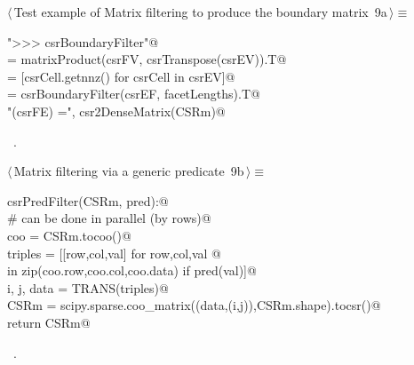 \documentclass[11pt,oneside]{article}    %
\begin{document}
\begin{flushleft} \small \label{scrap15}
\protect{}$\langle\,$Test example of Matrix filtering to produce the boundary matrix\nobreak\ {\footnotesize 9a}$\,\rangle\equiv$
\vspace{-1ex}
\begin{list}{}{} \item
\mbox{}\verb@print "\n>>> csrBoundaryFilter"@\\
\mbox{}\verb@csrEF = matrixProduct(csrFV, csrTranspose(csrEV)).T@\\
\mbox{}\verb@facetLengths = [csrCell.getnnz() for csrCell in csrEV]@\\
\mbox{}\verb@CSRm = csrBoundaryFilter(csrEF, facetLengths).T@\\
\mbox{}\verb@print "\ncsrMaxFilter(csrFE) =\n", csr2DenseMatrix(CSRm)@\\
\mbox{}\verb@@{\NWsep}
\end{list}
\vspace{-1ex}
\footnotesize\addtolength{\baselineskip}{-1ex}
\begin{list}{}{\setlength{\itemsep}{-\parsep}\setlength{\itemindent}{-\leftmargin}}
\item \NWtxtMacroRefIn\ .
\end{list}
\end{flushleft}
\begin{flushleft} \small \label{scrap16}
\protect{}$\langle\,$Matrix filtering via a generic predicate\nobreak\ {\footnotesize 9b}$\,\rangle\equiv$
\vspace{-1ex}
\begin{list}{}{} \item
\mbox{}\verb@def csrPredFilter(CSRm, pred):@\\
\mbox{}\verb@    # can be done in parallel (by rows)@\\
\mbox{}\verb@    coo = CSRm.tocoo()@\\
\mbox{}\verb@    triples = [[row,col,val] for row,col,val @\\
\mbox{}\verb@                in zip(coo.row,coo.col,coo.data) if pred(val)]@\\
\mbox{}\verb@    i, j, data = TRANS(triples)@\\
\mbox{}\verb@    CSRm = scipy.sparse.coo_matrix((data,(i,j)),CSRm.shape).tocsr()@\\
\mbox{}\verb@    return CSRm@\\
\mbox{}\verb@@{\NWsep}
\end{list}
\vspace{-1ex}
\footnotesize\addtolength{\baselineskip}{-1ex}
\begin{list}{}{\setlength{\itemsep}{-\parsep}\setlength{\itemindent}{-\leftmargin}}
\item \NWtxtMacroRefIn\ .
\end{list}
\end{flushleft}
\end{document}
